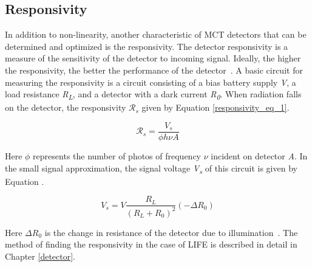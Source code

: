 \subsection {Responsivity}
In addition to non-linearity, another characteristic of MCT detectors that can be determined and optimized is the responsivity. The detector responsivity is a measure of the sensitivity of the detector to incoming signal. Ideally, the higher the responsivity, the better the performance of the detector~\citep{GLORIA_PhD}. A basic circuit for measuring the responsivity is a circuit consisting of a bias battery supply \textit{V}, a load resistance \textit{R\textsubscript{L}}, and a detector with a dark current \textit{R\textsubscript{0}}. When radiation falls on the detector, the responsivity $\mathcal{R}_s$ given by Equation \ref{responsivity_eq_1}.

\begin{equation} \label{responsivity_eq_1}
    \mathcal{R}_s = \frac{V_s}{\phi h \nu A}
\end{equation}

Here $\phi$ represents the number of photos of frequency $\nu$ incident on detector \textit{A}. In the small signal approximation, the signal voltage \textit{V\textsubscript{s}} of this circuit is given by Equation .

\begin{equation}
    V_s = V \frac{R_L}{(R_L+R_0)^2}(-\Delta R_0)
\end{equation}

Here $\Delta R_0$ is the change in resistance of the detector due to illumination~\citep{MCT_responsivity}. The method of finding the responsivity in the case of LIFE is described in detail in Chapter \ref{detector}.